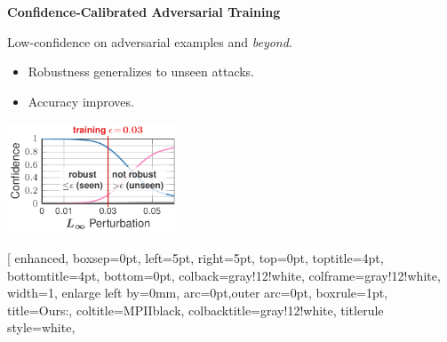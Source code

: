 \documentclass[64pt]{beamer}
\begin{document}
	\begin{frame}[t]{\bfseries Confidence-Calibrated Adversarial Training}
		\Large
		
		\vspace*{-0.15cm}
		Low-confidence on adversarial examples and \emph{beyond}.
		\begin{itemize}
			\item Robustness generalizes to unseen attacks.
			\item Accuracy improves.
		\end{itemize}
	
		\vspace*{-0.3cm}
		\begin{center}
			\begin{minipage}[t]{0.475\textwidth}
				\begin{tcolorbox}[
					enhanced,
					boxsep=0pt,
					left=5pt,
					right=5pt,
					top=0pt,
					toptitle=4pt,
					bottomtitle=4pt,
					bottom=0pt,
					colback=white,
					colframe=gray!25!white,
					width=1\textwidth, 
					enlarge left by=0mm,
					arc=0pt,outer arc=0pt,
					boxrule=1pt,
					title=\large Adversarial training:,
					coltitle=MPIIblack,
					colbacktitle=white,%
					collower=MPIIblack,
					]
				\includegraphics[width=5cm]{fig/introduction/advtrain_1_adversarial_unseen_narrow}
				\end{tcolorbox}
			\end{minipage}
			\begin{minipage}[t]{0.475\textwidth}
				\begin{tcolorbox}[
					enhanced,
					boxsep=0pt,
					left=5pt,
					right=5pt,
					top=0pt,
					toptitle=4pt,
					bottomtitle=4pt,
					bottom=0pt,
					colback=gray!12!white,
					colframe=gray!12!white,
					width=1\textwidth, 
					enlarge left by=0mm,
					arc=0pt,outer arc=0pt,
					boxrule=1pt,
					title=\large Ours\vphantom{g}:,
					coltitle=MPIIblack,
					colbacktitle=gray!12!white,
					titlerule style=white,%

\end{tcolorbox}
\end{minipage}
\end{center}
\end{frame}
\end{document}
